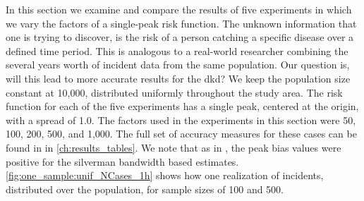 In this section we examine and compare the results of five experiments in which we vary the \glspl{factor}
of a single-peak risk function.
The unknown information that one is trying to discover, is the risk of a person catching a specific disease over a defined time period.
This is analogous to a real-world researcher combining the several years worth of incident data from the same population.
Our question is, will this lead to more accurate results for the \gls{dkd}?
We keep the population size constant at 10,000, distributed uniformly throughout the study area.
The risk function for each of the five experiments has a single peak,
centered at the origin,
with a \gls{spread} of 1.0.
The \glspl{factor} used in the experiments in this section were 50, 100, 200, 500, and 1,000.
The full set of accuracy measures for these cases can be found in  in \autoref{ch:results_tables}.
We note that as in , the \gls{peak bias} values were positive for the \gls{silverman} bandwidth based estimates.
\autoref{fig:one_sample:unif_NCases_1h} shows how one realization of incidents, distributed over the population, for sample sizes of 100 and 500.

